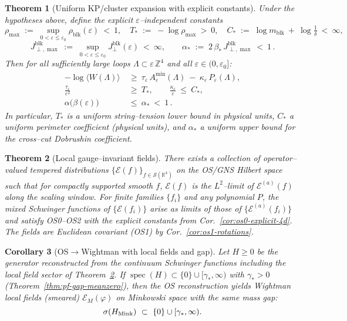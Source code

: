 \documentclass[11pt]{amsart}
\theoremstyle{plain}
\newtheorem{theorem}{Theorem}[section]
\newtheorem{corollary}[theorem]{Corollary}
\theoremstyle{definition}
\theoremstyle{remark}
\begin{document}
\begin{theorem}[Uniform KP/cluster expansion with explicit constants]
\label{thm:uniform-kp}
Under the hypotheses above, define the explicit $\varepsilon$–independent constants
\[
  \rho_{\max}\;:=\;\sup_{0<\varepsilon\le \varepsilon_0}\rho_{\mathrm{blk}}(\varepsilon)\ <\ 1,\quad
  T_*\;:=\; -\log \rho_{\max}\ >\ 0,\quad
  C_*\;:=\; \log m_{\mathrm{blk}}\ +\ \log\tfrac{1}{\delta}\ <\ \infty,
\]
\[
  J^{\mathrm{blk}}_{\perp,\max}\;:=\;\sup_{0<\varepsilon\le\varepsilon_0} J^{\mathrm{blk}}_{\perp}(\varepsilon)\ <\ \infty,\qquad
  \alpha_*\;:=\;2\,\beta_*\,J^{\mathrm{blk}}_{\perp,\max}\ <\ 1\,.
\]
Then for all sufficiently large loops $\Lambda\subset\varepsilon\,\mathbb Z^4$ and all $\varepsilon\in(0,\varepsilon_0]$:
\begin{align}
  -\log\langle W(\Lambda)\rangle\ &\ge\ \tau_\varepsilon\,A_\varepsilon^{\min}(\Lambda)\ -\ \kappa_\varepsilon\,P_\varepsilon(\Lambda),\\
  \frac{\tau_\varepsilon}{\varepsilon^2}\ &\ge\ T_*,\qquad \frac{\kappa_\varepsilon}{\varepsilon}\ \le\ C_*,\\
  \alpha\bigl(\beta(\varepsilon)\bigr)\ &\le\ \alpha_*\ <\ 1\,.
\end{align}
In particular, $T_*$ is a uniform string–tension lower bound in physical units, $C_*$ a uniform perimeter coefficient (physical units), and $\alpha_*$ a uniform upper bound for the cross–cut Dobrushin coefficient.
\end{theorem}
 

\begin{theorem}[Local gauge--invariant fields]\label{thm:local-fields-exist}
There exists a collection of operator--valued tempered distributions $\{\mathcal E(f)\}_{f\in \mathcal S(\mathbb R^4)}$ on the OS/GNS Hilbert space such that for compactly supported smooth $f$, $\mathcal E(f)$ is the $L^2$--limit of $\mathcal E^{(a)}(f)$ along the scaling window. For finite families $\{f_i\}$ and any polynomial $P$, the mixed Schwinger functions of $\{\mathcal E(f_i)\}$ arise as limits of those of $\{\mathcal E^{(a)}(f_i)\}$ and satisfy OS0--OS2 with the explicit constants from Cor.~\ref{cor:os0-explicit-4d}. The fields are Euclidean covariant (OS1) by Cor.~\ref{cor:os1-rotations}.
\end{theorem}

\begin{corollary}[OS$\to$Wightman with local fields and gap]\label{cor:wightman-local-gap}
Let $H\ge 0$ be the generator reconstructed from the continuum Schwinger functions including the local field sector of Theorem~\ref{thm:local-fields-exist}. If $\operatorname{spec}(H)\subset\{0\}\cup[\gamma_*,\infty)$ with $\gamma_*>0$ (Theorem~\ref{thm:pf-gap-meanzero}), then the OS reconstruction yields Wightman local fields (smeared) $\mathcal E_M(\varphi)$ on Minkowski space with the same mass gap:
\[
  \sigma(H_{\rm Mink})\ \subset\ \{0\}\cup[\gamma_*,\infty).
\]
\end{corollary}
\end{document}
